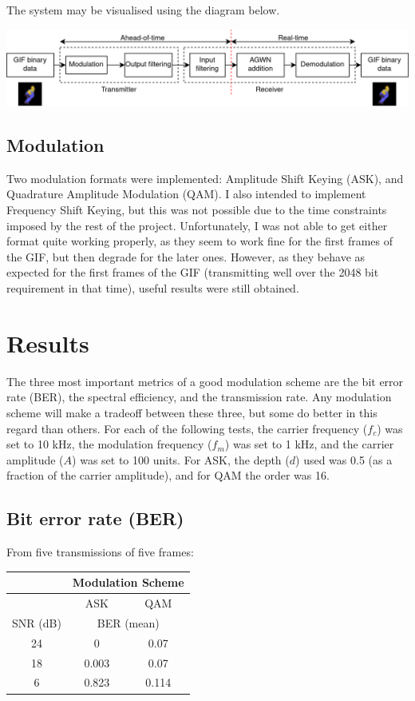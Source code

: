 \documentclass{article}
\begin{document}
The system may be visualised using the diagram below. 

\noindent
\includegraphics[width=\textwidth]{figures/system-diagram.png}

\subsection{Modulation}
Two modulation formats were implemented: Amplitude Shift Keying (ASK), and Quadrature Amplitude Modulation (QAM). I also intended to implement Frequency Shift Keying, but this was not possible due to the time constraints imposed by the rest of the project. Unfortunately, I was not able to get either format quite working properly, as they seem to work fine for the first frames of the GIF, but then degrade for the later ones. However, as they behave as expected for the first frames of the GIF (transmitting well over the 2048 bit requirement in that time), useful results were still obtained.

\section{Results}
The three most important metrics of a good modulation scheme are the bit error rate (BER), the spectral efficiency, and the transmission rate. Any modulation scheme will make a tradeoff between these three, but some do better in this regard than others. For each of the following tests, the carrier frequency ($f_c$) was set to 10 kHz, the modulation frequency ($f_m$) was set to 1 kHz, and the carrier amplitude ($A$) was set to 100 units. For ASK, the depth ($d$) used was 0.5 (as a fraction of the carrier amplitude), and for QAM the order was 16.   

\subsection{Bit error rate (BER)}
From five transmissions of five frames:
\begin{center}
    \begin{tabular}{|c|c|c|}
        \hline
                 & \multicolumn{2}{c|}{Modulation Scheme}         \\ \hline
                 & ASK                                    & QAM   \\ \hline
        SNR (dB) & \multicolumn{2}{c|}{BER (mean)}                \\ \hline
        24       & 0                                      & 0.07  \\
        18       & 0.003                                  & 0.07  \\
        6        & 0.823                                  & 0.114 \\ \hline
    \end{tabular}
\end{center}
\end{document}
